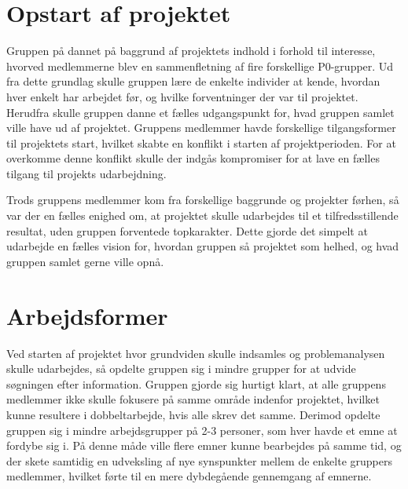 \newpage

\tableofcontents*												%

\newpage

\section{Opstart af projektet}

Gruppen på dannet på baggrund af projektets indhold i forhold til interesse, hvorved medlemmerne blev en sammenfletning af fire forskellige P0-grupper. Ud fra dette grundlag skulle gruppen lære de enkelte individer at kende, hvordan hver enkelt har arbejdet før, og hvilke forventninger der var til projektet. Herudfra skulle gruppen danne et fælles udgangspunkt for, hvad gruppen samlet ville have ud af projektet. Gruppens medlemmer havde forskellige tilgangsformer til projektets start, hvilket skabte en konflikt i starten af projektperioden. For at overkomme denne konflikt skulle der indgås kompromiser for at lave en fælles tilgang til projekts udarbejdning.

Trods gruppens medlemmer kom fra forskellige baggrunde og projekter førhen, så var der en fælles enighed om, at projektet skulle udarbejdes til et tilfredsstillende resultat, uden gruppen forventede topkarakter. Dette gjorde det simpelt at udarbejde en fælles vision for, hvordan gruppen så projektet som helhed, og hvad gruppen samlet gerne ville opnå.

\section{Arbejdsformer}

Ved starten af projektet hvor grundviden skulle indsamles og problemanalysen skulle udarbejdes, så opdelte gruppen sig i mindre grupper for at udvide søgningen efter information. Gruppen gjorde sig hurtigt klart, at alle gruppens medlemmer ikke skulle fokusere på samme område indenfor projektet, hvilket kunne resultere i dobbeltarbejde, hvis alle skrev det samme. Derimod opdelte gruppen sig i mindre arbejdsgrupper på 2-3 personer, som hver havde et emne at fordybe sig i. På denne måde ville flere emner kunne bearbejdes på samme tid, og der skete samtidig en udveksling af nye synspunkter mellem de enkelte gruppers medlemmer, hvilket førte til en mere dybdegående gennemgang af emnerne. 

